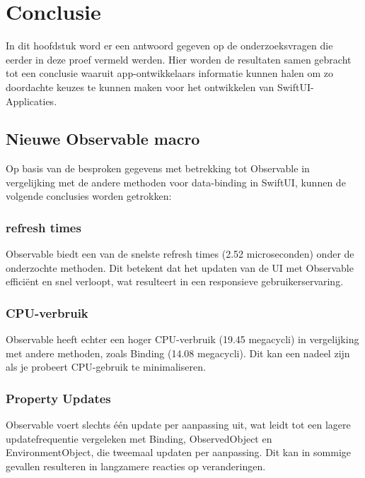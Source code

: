 
\chapter{Conclusie}%
\label{ch:conclusie}



\newpage
In dit hoofdstuk word er een antwoord gegeven op de onderzoeksvragen die eerder in deze proef vermeld werden. Hier worden de resultaten samen gebracht tot een conclusie waaruit app-ontwikkelaars informatie kunnen halen om zo doordachte keuzes te kunnen maken voor het ontwikkelen van SwiftUI-Applicaties.
 
\section{Nieuwe Observable macro}
Op basis van de besproken gegevens met betrekking tot Observable in vergelijking met de andere methoden voor data-binding in SwiftUI, kunnen de volgende conclusies worden getrokken:
\subsection{refresh times}
Observable biedt een van de snelste refresh times (2.52 microseconden) onder de onderzochte methoden. Dit betekent dat het updaten van de UI met Observable efficiënt en snel verloopt, wat resulteert in een responsieve gebruikerservaring.
\subsection{CPU-verbruik}
Observable heeft echter een hoger CPU-verbruik (19.45 megacycli) in vergelijking met andere methoden, zoals Binding (14.08 megacycli). Dit kan een nadeel zijn als je probeert CPU-gebruik te minimaliseren.
\subsection{Property Updates}
Observable voert slechts één update per aanpassing uit, wat leidt tot een lagere updatefrequentie vergeleken met Binding, ObservedObject en EnvironmentObject, die tweemaal updaten per aanpassing. Dit kan in sommige gevallen resulteren in langzamere reacties op veranderingen.
